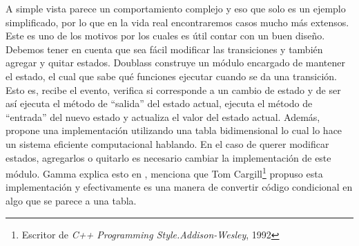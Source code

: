 A simple vista parece un comportamiento complejo y eso que solo es un ejemplo simplificado, por lo que en la vida real encontraremos casos mucho más extensos. Este es uno de los motivos por los cuales es útil contar con un buen diseño. Debemos tener en cuenta que sea fácil modificar las transiciones y también agregar y quitar estados. Doublass construye un módulo encargado de mantener el estado, el cual que sabe qué funciones ejecutar cuando se da una transición. Esto es, recibe el evento, verifica si corresponde a un cambio de estado y de ser así ejecuta el método de ``salida'' del estado actual, ejecuta el método de ``entrada'' del nuevo estado y actualiza el valor del estado actual. Además, propone una implementación utilizando una tabla bidimensional lo cual lo hace un sistema eficiente computacional hablando. En el caso de querer modificar estados, agregarlos o quitarlo es necesario cambiar la implementación de este módulo. Gamma explica esto en \cite[State]{Gamma:1995:DPE:186897}, menciona que Tom Cargill\footnote{Escritor de \textit{C++ Programming Style.Addison-Wesley}, 1992} propuso esta implementación y efectivamente es una manera de convertir código condicional en algo que se parece a una tabla.

